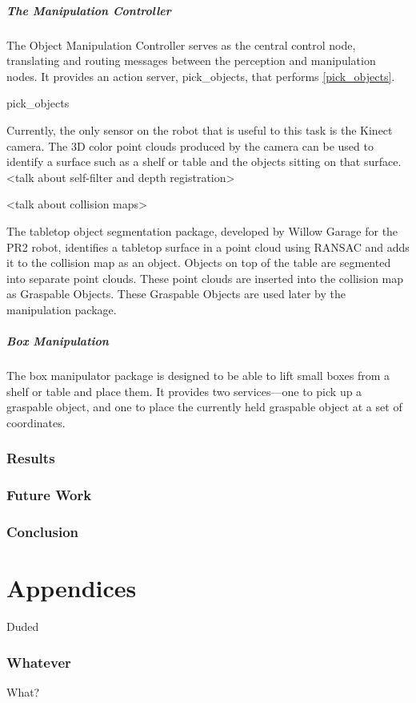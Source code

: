 \documentclass{cwru}
\begin{document}
\subsubsection{The Manipulation Controller}
The Object Manipulation Controller serves as the central control node, translating and routing messages between the perception and manipulation nodes. It provides an action server, pick\_objects, that performs \ref{pick_objects}.

\begin{algorithm}
\caption{pick_objects}
\label{pick_objects}
\begin{algorithmic}
\end{algorithmic}
\end{algorithm}

Currently, the only sensor on the robot that is useful to this task is the Kinect camera. The 3D color point clouds produced by the camera can be used to identify a surface such as a shelf or table and the objects sitting on that surface. {\textless}talk about self-filter and depth registration{\textgreater}

{\textless}talk about collision maps{\textgreater}

The tabletop object segmentation package, developed by Willow Garage \cite{tabletop} for the PR2 robot, identifies a tabletop surface in a point cloud using RANSAC \cite{ransac} and adds it to the collision map as an object. Objects on top of the table are segmented into separate point clouds. These point clouds are inserted into the collision map as Graspable Objects. These Graspable Objects are used later by the manipulation package.

\subsubsection[Box Manipulation]{Box Manipulation}
The box manipulator package is designed to be able to lift small boxes from a shelf or table and place them. It provides two services---one to pick up a graspable object, and one to place the currently held graspable object at a set of coordinates. 

\section[Results]{Results}
\section[Future Work]{Future Work}
\section[Conclusion]{Conclusion}
\appendix
\part{Appendices}

Duded

\section{Whatever}

What?

\end{document}
